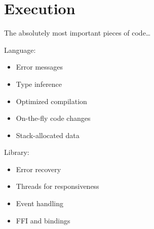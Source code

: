 \chapter{Execution}

The absolutely most important pieces of code\ldots{}

Language:

\begin{itemize}
\item Error messages
\item Type inference
\item Optimized compilation
\item On-the-fly code changes
\item Stack-allocated data
\end{itemize}

Library:

\begin{itemize}
\item Error recovery
\item Threads for responsiveness
\item Event handling
\item FFI and bindings
\end{itemize}

